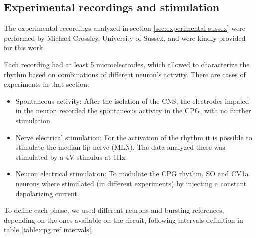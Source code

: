 \subsection{Experimental recordings and stimulation}
\label{subsec:methods experimental intervals}
The experimental recordings analyzed in section \ref{sec:experimental sussex} were performed by Michael Crossley, University of Sussex, and were kindly provided for this work. 

Each recording had at least 5 microelectrodes, which allowed to characterize the rhythm based on combinations of different neuron's activity. There are cases of experiments in that section:
\begin{itemize}
	\item Spontaneous activity: After the isolation of the CNS, the electrodes impaled in the neuron recorded the spontaneous activity in the CPG, with no further stimulation.
	\item Nerve electrical stimulation: For the activation of the rhythm it is possible to stimulate the median lip nerve (MLN). The data analyzed there was stimulated by a 4V stimulus at 1Hz. 
	\item Neuron electrical stimulation: To modulate the CPG rhythm, SO and CV1a neurons where stimulated (in different experiments) by injecting a constant depolarizing current.
\end{itemize}

To define each phase, we used different neurons and bursting references, depending on the ones available on the circuit, following intervals definition in table \ref{table:cpg ref intervals}.

